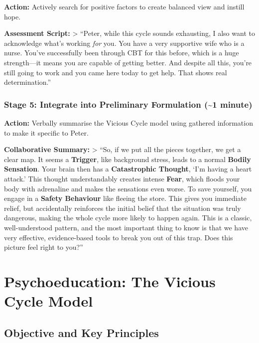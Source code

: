 \documentclass[
  american,
  letterpaper,
  DIV=11,
  numbers=noendperiod]{scrartcl}
\begin{document}
\textbf{Action:} Actively search for positive factors to create balanced
view and instill hope.

\textbf{Assessment Script:} \textgreater{} ``Peter, while this cycle
sounds exhausting, I also want to acknowledge what's working \emph{for}
you. You have a very supportive wife who is a nurse. You've successfully
been through CBT for this before, which is a huge strength---it means
you are capable of getting better. And despite all this, you're still
going to work and you came here today to get help. That shows real
determination.''

\subsubsection{Stage 5: Integrate into Preliminary Formulation
(\textasciitilde1
minute)}\label{stage-5-integrate-into-preliminary-formulation-1-minute}

\textbf{Action:} Verbally summarise the Vicious Cycle model using
gathered information to make it specific to Peter.

\textbf{Collaborative Summary:} \textgreater{} ``So, if we put all the
pieces together, we get a clear map. It seems a \textbf{Trigger}, like
background stress, leads to a normal \textbf{Bodily Sensation}. Your
brain then has a \textbf{Catastrophic Thought}, `I'm having a heart
attack.' This thought understandably creates intense \textbf{Fear},
which floods your body with adrenaline and makes the sensations even
worse. To save yourself, you engage in a \textbf{Safety Behaviour} like
fleeing the store. This gives you immediate relief, but accidentally
reinforces the initial belief that the situation was truly dangerous,
making the whole cycle more likely to happen again. This is a classic,
well-understood pattern, and the most important thing to know is that we
have very effective, evidence-based tools to break you out of this trap.
Does this picture feel right to you?''

\section{Psychoeducation: The Vicious Cycle
Model}\label{psychoeducation-the-vicious-cycle-model}

\subsection{Objective and Key
Principles}\label{objective-and-key-principles}
\end{document}

